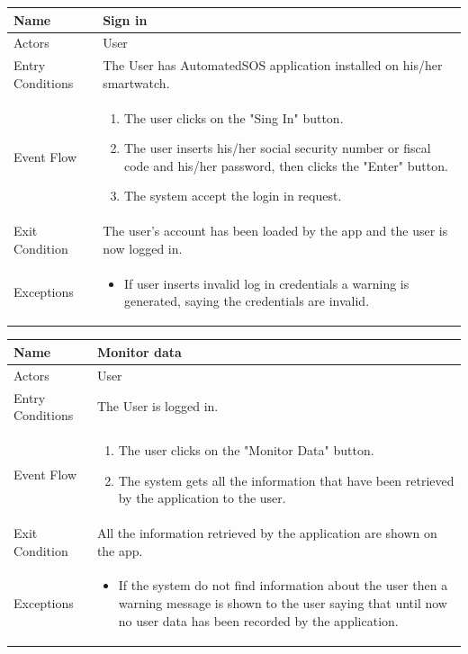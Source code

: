 \begin{enumerate}
\FloatBarrier
\begin{table}[h]
\begin{tabular}{|l|l|}
\hline
Name             & Sign in \\ \hline
Actors           & User  \\ \hline
Entry Conditions & The User has AutomatedSOS application installed on his/her smartwatch.    \\ \hline
Event Flow       & \parbox{.45\textwidth}{\begin{enumerate}
            \item The user clicks on the "Sing In" button.
            \item The user inserts his/her social security number or fiscal code and his/her password, then clicks the "Enter" button.
            \item The system accept the login in request.
        \end{enumerate}}\\ \hline
Exit Condition   & The user's account has been loaded by the app and the user is now logged in.\\ \hline
Exceptions       & \parbox{.45\textwidth}  
{\begin{itemize}
\item If user inserts invalid log in credentials a warning is generated, saying the credentials are invalid.
\end{itemize}}\\ \hline
\end{tabular}
\end{table}
\FloatBarrier

\FloatBarrier
\begin{table}[h]
\begin{tabular}{|l|l|}
\hline
Name             & Monitor data \\ \hline
Actors           & User  \\ \hline
Entry Conditions & The User is logged in. \\ \hline
Event Flow       & \parbox{.45\textwidth}{\begin{enumerate}
            \item The user clicks on the "Monitor Data" button.
            \item The system gets all the information that have been retrieved by the application to the user.
\end{enumerate}}\\ \hline
Exit Condition   & All the information retrieved by the application are shown on the app.\\ \hline
Exceptions       & \parbox{.45\textwidth}  
{\begin{itemize}
\item If the system do not find information about the user then a warning message is shown to the user saying that until now no user data has been recorded by the application.
\end{itemize}}  \\ \hline
\end{tabular}
\end{table}
\FloatBarrier


\end{enumerate}
